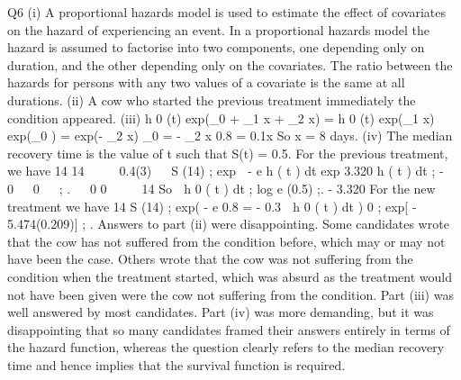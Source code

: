 \documentclass[a4paper,12pt]{article}
\begin{document}
Q6
(i)
A proportional hazards model is used to estimate the effect of covariates on
the hazard of experiencing an event.
In a proportional hazards model the hazard is assumed to factorise into two
components, one depending only on duration, and the other depending only on
the covariates.
The ratio between the hazards for persons with any two values of a covariate is
the same at all durations.
(ii) A cow who started the previous treatment immediately the condition appeared.
(iii) h 0 (t) exp(\beta_0 + \beta_1 x + \beta_2 x) = h 0 (t) exp(\beta_1 x)
exp(\beta_0 ) = exp(- \beta_2 x)
\beta_0 = - \beta_2 x
0.8 = 0.1x
So x = 8 days.
(iv)
The median recovery time is the value of t such that S(t) = 0.5.
For the previous treatment, we have
14
14




0.4(3)


S (14) ;\+\; exp  - e
h
(
t
)
dt
exp
3.320
h
(
t
)
dt
;\+\;
-
 0 
 0   ;\+ .


0
0




14
So
 h 0 ( t ) dt ;\+
log e (0.5)
;\+.
- 3.320
For the new treatment we have
14
S (14) ;\+\; exp( - e 0.8 \;= - 0.3  h 0 ( t ) dt )
0
;\+\; exp[ - 5.474(0.209)] ;\+ .
Answers to part (ii) were disappointing. Some candidates wrote that the cow
has not suffered from the condition before, which may or may not have been
the case. Others wrote that the cow was not suffering from the condition
when the treatment started, which was absurd as the treatment would not
have been given were the cow not suffering from the condition. Part (iii) was
well answered by most candidates. Part (iv) was more demanding, but it was
disappointing that so many candidates framed their answers entirely in terms
of the hazard function, whereas the question clearly refers to the median
recovery time and hence implies that the survival function is required.
\end{document}
